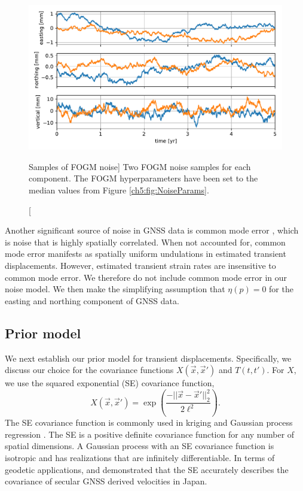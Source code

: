 \begin{figure}
\includegraphics{ch5/figures/noise/noise-samples.pdf}
\caption
[Samples of FOGM noise]
{Two FOGM noise samples for each component. The FOGM
hyperparameters have been set to the median values from Figure
\ref{ch5:fig:NoiseParams}.}
\label{ch5:fig:NoiseSamples}
\end{figure}

Another significant source of noise in GNSS data is common mode error
\citep[e.g.,][]{Wdowinski1997,Dong2006}, which is noise that is highly
spatially correlated. When not accounted for, common mode error
manifests as spatially uniform undulations in estimated transient
displacements. However, estimated transient strain rates are
insensitive to common mode error. We therefore do not include common
mode error in our noise model. We then make the simplifying assumption
that $\eta(p) = 0$ for the easting and northing component of GNSS
data.

\subsection{Prior model}\label{ch5:sec:SignalModel}
We next establish our prior model for transient displacements.
Specifically, we discuss our choice for the covariance functions
$X(\vec{x},\vec{x}')$ and $T(t,t')$. For $X$, we use the squared
exponential (SE) covariance function,
\begin{equation}\label{ch5:eq:SE}
X(\vec{x},\vec{x}') = \exp\left(\frac{-||\vec{x} - \vec{x}'||_2^2}{2 \ell^2}\right).
\end{equation}
The SE covariance function is commonly used in kriging
\citep[e.g,][]{Cressie1992} and Gaussian process regression
\citep[e.g.,][]{Rasmussen2006}. The SE is a positive definite
covariance function for any number of spatial dimensions. A Gaussian
process with an SE covariance function is isotropic and has
realizations that are infinitely differentiable. In terms of geodetic
applications, \citet{Kato1998} and \cite{El-Fiky1999} demonstrated
that the SE accurately describes the covariance of secular GNSS
derived velocities in Japan.

